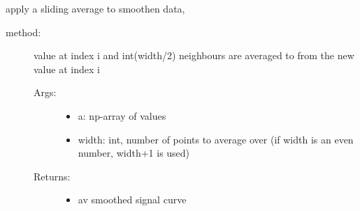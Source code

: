 \documentclass[letterpaper,10pt,english]{sphinxmanual}
\begin{document}
\begin{fulllineitems}
\label{\detokenize{index:PhyPraKit.PhyPraKit.meanFilter}}
apply a sliding average to smoothen data,
\begin{description}
\item[{method:}] \leavevmode
value at index i and int(width/2) neighbours are averaged
to from the new value at index i
\begin{description}
\item[{Args:}] \leavevmode\begin{itemize}
\item {} 
a: np-array of values

\item {} 
width: int, number of points to average over
(if width is an even number, width+1 is used)

\end{itemize}

\item[{Returns:}] \leavevmode\begin{itemize}
\item {} 
av  smoothed signal curve

\end{itemize}

\end{description}

\end{description}

\end{fulllineitems}

\end{document}
